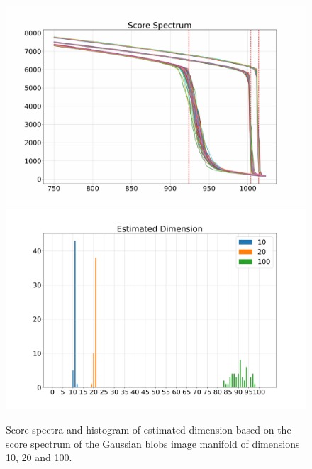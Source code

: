 \begin{figure}[H]
   \begin{minipage}[t]{.45\textwidth}
       \centering
       \includegraphics[width=.95\textwidth]{chapter3/figures/image_manifolds/gaussians_spectrum.jpg}\\
       \includegraphics[width=.95\textwidth]{chapter3/figures/image_manifolds/gaussians_spectrum_adhoc.png}
       \caption{Score spectra and histogram of estimated dimension based on the score spectrum of the Gaussian blobs image manifold of dimensions 10, 20 and 100.}
       \label{ch3:fig:gaussians_spectrum}
   \end{minipage}
   \end{figure}
   
   
